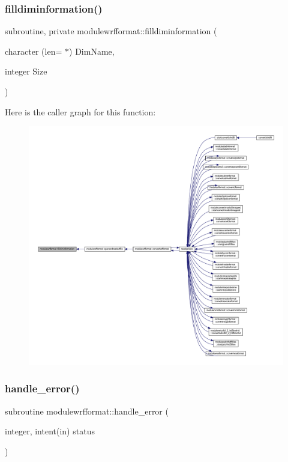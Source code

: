 \subsubsection{\texorpdfstring{filldiminformation()}{filldiminformation()}}
{\footnotesize\ttfamily subroutine, private modulewrfformat\+::filldiminformation (\begin{DoxyParamCaption}\item[{character (len= $\ast$)}]{Dim\+Name,  }\item[{integer}]{Size }\end{DoxyParamCaption})\hspace{0.3cm}{\ttfamily [private]}}

Here is the caller graph for this function\+:\nopagebreak
\begin{figure}[H]
\begin{center}
\leavevmode
\includegraphics[width=350pt]{namespacemodulewrfformat_aad3ae96f01cad78355724f71c1705c80_icgraph}
\end{center}
\end{figure}
\mbox{\label{namespacemodulewrfformat_a00cdab997f51c9c9b8bf3a5b45ff8969}} 
\subsubsection{\texorpdfstring{handle\+\_\+error()}{handle\_error()}}
{\footnotesize\ttfamily subroutine modulewrfformat\+::handle\+\_\+error (\begin{DoxyParamCaption}\item[{integer, intent(in)}]{status }\end{DoxyParamCaption})\hspace{0.3cm}{\ttfamily [private]}}

